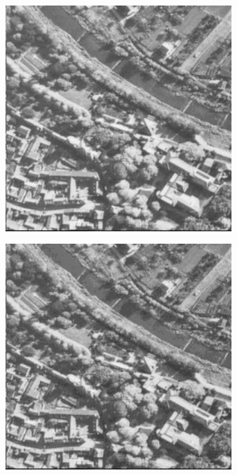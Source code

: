 \begin{figure}
\begin{subfigure}[b]{.23\textwidth}
  \caption{}
  \label{fig:test-images-aerial}
\end{subfigure}
\begin{subfigure}[b]{.23\textwidth}
  \centering
  \includegraphics[width=0.95\textwidth]{figures/test-images/truncate2/aerial}
  \caption{}
  \label{fig:test-images-aerial}
\end{subfigure}
\begin{subfigure}[b]{.23\textwidth}
  \centering
  \includegraphics[width=0.95\textwidth]{figures/test-images/truncate4/aerial}
  \caption{}
  \label{fig:test-images-aerial}
\end{subfigure}


\end{figure}
